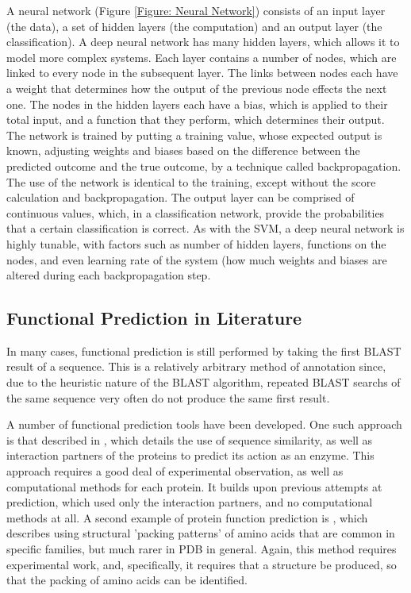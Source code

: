 \documentclass[12pt]{report}
\begin{document}
				A neural network (Figure \ref{Figure: Neural Network}) consists of an input layer (the data), a set of hidden layers (the computation) and an output layer (the classification).  A deep neural network has many hidden layers, which allows it to model more complex systems.  Each layer contains a number of nodes, which are linked to every node in the subsequent layer.  The links between nodes each have a weight that determines how the output of the previous node effects the next one.  The nodes in the hidden layers each have a bias, which is applied to their total input, and a function that they perform, which determines their output.  The network is trained by putting a training value, whose expected output is known,  adjusting weights and biases based on the difference between the predicted outcome and the true outcome, by a technique called backpropagation.  The use of the network is identical to the training, except without the score calculation and backpropagation.  The output layer can be comprised of continuous values, which, in a classification network, provide the probabilities that a certain classification is correct.  As with the SVM, a deep neural network is highly tunable, with factors such as number of hidden layers, functions on the nodes, and even learning rate of the system (how much weights and biases are altered during each backpropagation step.		
		
		\subsection{Functional Prediction in Literature}
			
			In many cases, functional prediction is still performed by taking the first BLAST result of a sequence.  This is a relatively arbitrary method of annotation since, due to the heuristic nature of the BLAST algorithm, repeated BLAST searchs of the same sequence very often do not produce the same first result.
			
			A number of functional prediction tools have been developed.  One such approach is that described in \cite{RefWorks:doc:5d822c8ce4b07f40b9eae1b7}, which details the use of sequence similarity, as well as interaction partners of the proteins to predict its action as an enzyme.  This approach requires a good deal of experimental observation, as well as computational methods for each protein.  It builds upon previous attempts at prediction, which used only the interaction partners, and no computational methods at all.  A second example of protein function prediction is \cite{RefWorks:doc:5d822cfce4b0506e9759e8f8}, which describes using structural 'packing patterns' of amino acids that are common in specific families, but much rarer in PDB in general.  Again, this method requires experimental work, and, specifically, it requires that a structure be produced, so that the packing of amino acids can be identified. 
		
\end{document}
